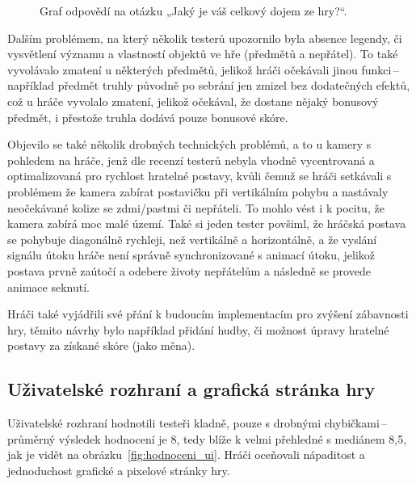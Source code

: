 \begin{figure}[ht]
    \centering
    \caption{Graf odpovědí na otázku „Jaký je váš celkový dojem ze hry?“.}
    \label{fig:hodnoceni_celkovy_dojem}
\end{figure}

Dalším problémem, na který několik testerů upozornilo byla absence legendy, či vysvětlení významu a vlastností objektů ve hře (předmětů a nepřátel). To také vyvolávalo zmatení u některých předmětů, jelikož hráči očekávali jinou funkci\,--\,například předmět truhly původně po sebrání jen zmizel bez dodatečných efektů, což u hráče vyvolalo zmatení, jelikož očekával, že dostane nějaký bonusový předmět, i přestože truhla dodává pouze bonusové skóre.

Objevilo se také několik drobných technických problémů, a to u kamery s pohledem na hráče, jenž dle recenzí testerů nebyla vhodně vycentrovaná a optimalizovaná pro rychlost hratelné postavy, kvůli čemuž se hráči setkávali s problémem že kamera  zabírat postavičku při vertikálním pohybu a nastávaly neočekávané kolize se zdmi/pastmi či nepřáteli. To mohlo vést i k pocitu, že kamera zabírá moc malé území. Také si jeden tester povšiml, že hráčská postava se pohybuje diagonálně rychleji, než vertikálně a horizontálně, a že vyslání signálu útoku hráče není správně synchronizované s animací útoku, jelikož postava prvně zaútočí a odebere životy nepřátelům a následně se provede animace seknutí.

Hráči také vyjádřili své přání k budoucím implementacím pro zvýšení zábavnosti hry, těmito návrhy bylo například přidání hudby, či možnost úpravy hratelné postavy za získané skóre (jako měna).

\subsection*{Uživatelské rozhraní a grafická stránka hry}
Uživatelské rozhraní hodnotili testeři kladně, pouze s drobnými chybičkami\,--\,průměrný výsledek hodnocení je 8, tedy blíže k velmi přehledné s mediánem 8,5, jak je vidět na obrázku~\ref{fig:hodnoceni_ui}. Hráči oceňovali nápaditost a jednoduchost grafické a pixelové stránky hry. 

